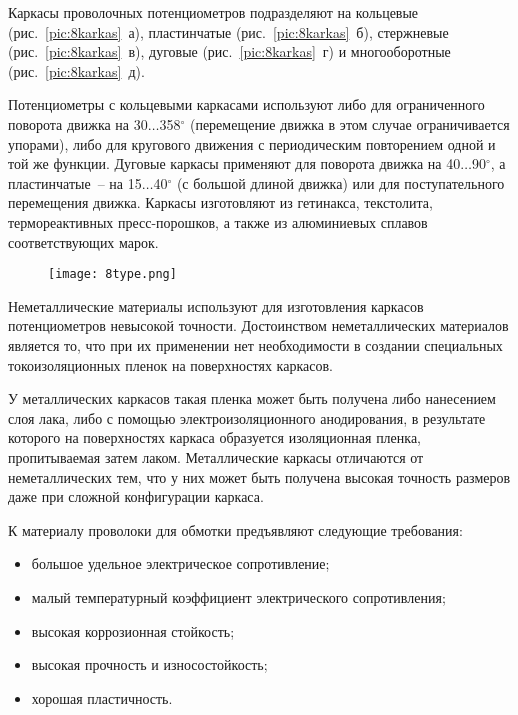 Каркасы проволочных потенциометров подразделяют на кольцевые (рис.~\ref{pic:8karkas}~а), пластинчатые (рис.~\ref{pic:8karkas}~б), стержневые (рис.~\ref{pic:8karkas}~в), дуговые (рис.~\ref{pic:8karkas}~г) и многооборотные (рис.~\ref{pic:8karkas}~д).

Потенциометры с кольцевыми каркасами используют либо для ограниченного поворота движка на 30$ \ldots $358$ ^\circ $ (перемещение движка в этом случае ограничивается упорами), либо для кругового движения с периодическим повторением одной и той же функции. Дуговые каркасы применяют для поворота движка на 40$ \ldots $90$ ^\circ $, а пластинчатые~-- на 15$ \ldots $40$ ^\circ $ (с большой длиной движка) или для поступательного перемещения движка. Каркасы изготовляют из гетинакса, текстолита, термореактивных пресс-порошков, а также из алюминиевых сплавов соответствующих марок.

\begin{figure}[h!]
	\caption{  }
	\texttt{[image: 8type.png]}
	\label{pic:8type}
\end{figure}

Неметаллические материалы используют для изготовления каркасов потенциометров невысокой точности. Достоинством неметаллических материалов является то, что при их применении нет необходимости в создании специальных токоизоляционных пленок на поверхностях каркасов. 

У металлических каркасов такая пленка может быть получена либо нанесением слоя лака, либо с помощью электроизоляционного анодирования, в результате которого на поверхностях каркаса образуется изоляционная пленка, пропитываемая затем лаком. Металлические каркасы отличаются от неметаллических тем, что у них может быть получена высокая точность размеров даже при сложной конфигурации каркаса.

К материалу проволоки для обмотки предъявляют следующие требования: 
\begin{itemize}
	\item большое удельное электрическое сопротивление;
	\item малый температурный коэффициент электрического сопротивления;
	\item высокая коррозионная стойкость;
	\item высокая прочность и износостойкость;
	\item хорошая пластичность. 
\end{itemize}

